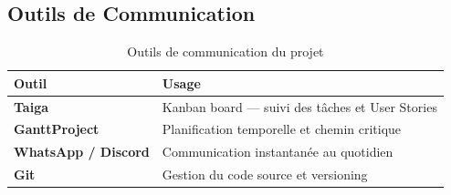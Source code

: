 \subsection{Outils de Communication}

\begin{table}[H]
\centering
\begin{tabularx}{\textwidth}{L{4cm} X}
\toprule
\textbf{\color{primarycolor}Outil} & \textbf{\color{primarycolor}Usage} \\
\midrule
\textbf{Taiga} & Kanban board --- suivi des tâches et User Stories \\
\textbf{GanttProject} & Planification temporelle et chemin critique \\
\textbf{WhatsApp / Discord} & Communication instantanée au quotidien \\
\textbf{Git} & Gestion du code source et versioning \\
\bottomrule
\end{tabularx}
\caption{Outils de communication du projet}
\end{table}
